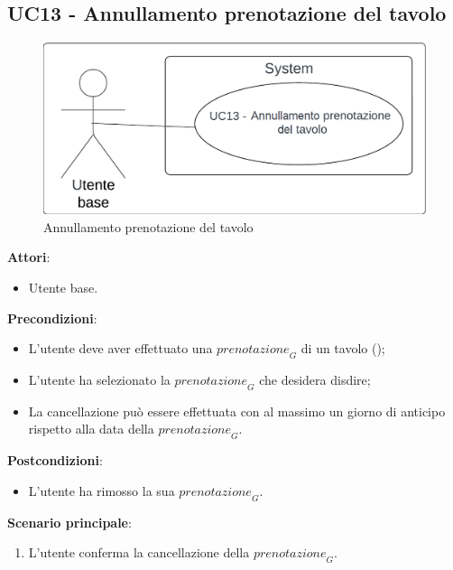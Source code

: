 \subsection{UC13 - Annullamento prenotazione del tavolo} \label{usecase:13}
\begin{figure}[H]
\centering
\includegraphics[width=0.75\linewidth]{ucd/ucd13.png}
\caption{Annullamento prenotazione del tavolo}
\end{figure}
\textbf{Attori}:
\begin{itemize}
    \item Utente base.
\end{itemize}
\textbf{Precondizioni}:
\begin{itemize}
    \item L'utente deve aver effettuato una $\textit{prenotazione}_G$ di un tavolo ();
    \item L'utente ha selezionato la $\textit{prenotazione}_G$ che desidera disdire;
    \item La cancellazione può essere effettuata con al massimo un giorno di anticipo rispetto alla data della $\textit{prenotazione}_G$.
\end{itemize}
\textbf{Postcondizioni}:
\begin{itemize}
    \item L'utente ha rimosso la sua $\textit{prenotazione}_G$.
\end{itemize}
\textbf{Scenario principale}:
\begin{enumerate}
    \item L'utente conferma la cancellazione della $\textit{prenotazione}_G$.
\end{enumerate}
\newpage